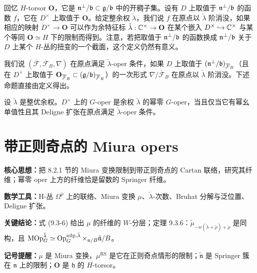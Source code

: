 回忆 $H$-torsor $\mathbf{O}$，它是 $\mathfrak{n}^\perp/\mathfrak{b}\subset\mathfrak{g}/\mathfrak{b}$ 中的开稠子集。设有 $D$ 上取值于 $\mathfrak{n}^\perp/\mathfrak{b}$ 的函数 $f$，它在 $D^\times$ 上取值于 $\mathbf{O}$。给定整余权 $\check\lambda$，我们说 $f$ 在原点以 $\check\lambda$ 阶消没，如果相应的映射 $D^\times\to\mathbf{O}$ 可以作为余特征标 $\check\lambda:\mathbb{C}^\times\to\mathbf{O}$ 在某个嵌入 $D^\times\hookrightarrow\mathbb{C}^\times$ 与某个等同 $\mathbf{O}\simeq H$ 下的限制而得到。注意，若把取值于 $\mathfrak{n}^\perp/\mathfrak{b}$ 的函数换成 $\mathfrak{n}^\perp/\mathfrak{b}$ 关于 $D$ 上某个 $H$-丛的扭变的一个截面，这个定义仍然有意义。


我们说 $(\overline{\mathcal{F}},\overline{\mathcal{F}}_B,\nabla)$ 在原点满足 $\check\lambda$-oper 条件，如果 $D$ 上取值于 $(\mathfrak{n}^\perp/\mathfrak{b})_{\overline{\mathcal{F}}_B}$（且在 $D^\times$ 上取值于 $\mathbf{O}_{\overline{\mathcal{F}}_B}\subset(\mathfrak{g}/\mathfrak{b})_{\overline{\mathcal{F}}_B}$）的一次形式 $\nabla/\overline{\mathcal{F}}_B$ 在原点以 $\check\lambda$ 阶消没。下述命题直接由定义得出。

\begin{proposition}
设 $\check\lambda$ 是整优余权。$D^\times$ 上的 $G$-oper 是余权 $\check\lambda$ 的幂零 $G$-oper，当且仅当它有幂幺单值性且其 Deligne 扩张在原点满足 $\check\lambda$-oper 条件。
\end{proposition}

\section{带正则奇点的 Miura opers}

\begin{keypoints}
    \item \textbf{核心思想：}把 8.2.1 节的 Miura 变换限制到带正则奇点的 Cartan 联络，研究其纤维；幂零 oper 上方的纤维恰是留数的 Springer 纤维。
    \item \textbf{数学工具：}H-丛 $\Omega^{\check\rho}$ 上的联络、Miura 变换 $\mu$、$\check\lambda$-次数、Bruhat 分解与泛位置、Deligne 扩张。
    \item \textbf{关键结论：}式 (9.3-6) 给出 $\mu$ 的纤维的 $W$-分层；定理 9.3.6：$\tilde\mu_{-w(\check\lambda+\check\rho)+\check\rho}$ 是同构，且 $\mathrm{MOp}^{\check\lambda}_G\simeq\operatorname{Op}^{\mathrm{nilp},\check\lambda}_G\times_{\mathfrak{n}/B}\tilde{\mathfrak{n}}/B$。
    \item \textbf{记号提醒：}$\mu$ 是 Miura 变换，$\mu^{\mathrm{RS}}$ 是它在正则奇点情形的限制；$\tilde{\mathfrak{n}}$ 是 Springer 簇在 $\mathfrak{n}$ 上的限制；$\mathbf{O}$ 是 $\mathfrak{h}$ 的 $H$-torsor。
\end{keypoints}

